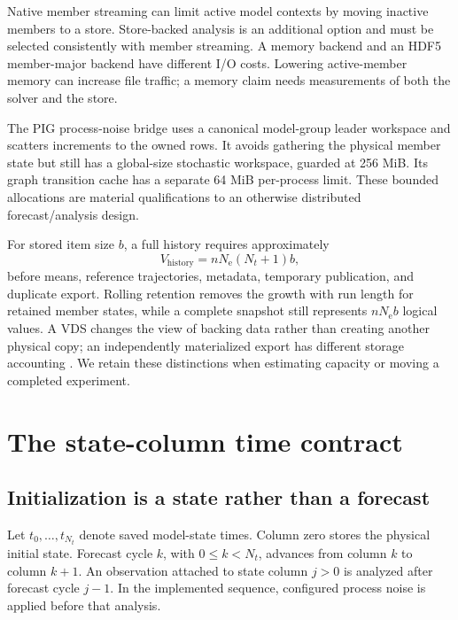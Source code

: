 \documentclass[11pt,a4paper]{article}
\newcommand{\Ne}{N_{\mathrm e}}
\begin{document}
Native member streaming can limit active model contexts by moving inactive members to a store. Store-backed analysis is an additional option and must be selected consistently with member streaming. A memory backend and an HDF5 member-major backend have different I/O costs. Lowering active-member memory can increase file traffic; a memory claim needs measurements of both the solver and the store.

The PIG process-noise bridge uses a canonical model-group leader workspace and scatters increments to the owned rows. It avoids gathering the physical member state but still has a global-size stochastic workspace, guarded at 256 MiB. Its graph transition cache has a separate 64 MiB per-process limit. These bounded allocations are material qualifications to an otherwise distributed forecast/analysis design.


For stored item size \(b\), a full history requires approximately
\begin{equation}
 V_{\mathrm{history}}=n\Ne(N_t+1)b,
 \label{eq:historyvolume}
\end{equation}
before means, reference trajectories, metadata, temporary publication, and duplicate export. Rolling retention removes the growth with run length for retained member states, while a complete snapshot still represents \(n\Ne b\) logical values. A VDS changes the view of backing data rather than creating another physical copy; an independently materialized export has different storage accounting \citep{hdf5vds}. We retain these distinctions when estimating capacity or moving a completed experiment.

\section{The state-column time contract}
\subsection{Initialization is a state rather than a forecast}
Let \(t_0,\ldots,t_{N_t}\) denote saved model-state times. Column zero stores the physical initial state. Forecast cycle \(k\), with \(0\leq k<N_t\), advances from column \(k\) to column \(k+1\). An observation attached to state column \(j>0\) is analyzed after forecast cycle \(j-1\). In the implemented sequence, configured process noise is applied before that analysis.
\end{document}
